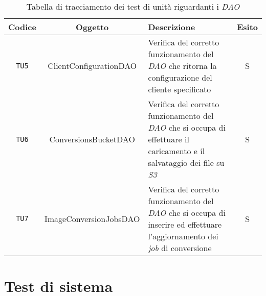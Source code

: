 \begin{table}[H]
    \caption{Tabella di tracciamento dei test di unità riguardanti i \emph{DAO}}
    \label{tab:test-dao}
    \begin{tabularx}{\textwidth}{|c|c|X|c|}
        \hline
        \textbf{Codice}                                          &
        \textbf{Oggetto}                                         & \textbf{Descrizione }  & \textbf{Esito} \\
        \hline
        \verb|TU5|                                               & ClientConfigurationDAO & Verifica del
        corretto funzionamento del \emph{DAO} che ritorna la configurazione del
        cliente specificato                                      & S                                       \\
        \hline
        \verb|TU6|                                               & ConversionsBucketDAO   & Verifica del
        corretto funzionamento del \emph{DAO} che si occupa di effettuare il
        caricamento e il salvataggio dei file su \emph{S3}       & S                                       \\
        \hline
        \verb|TU7|                                               & ImageConversionJobsDAO & Verifica del
        corretto funzionamento del \emph{DAO} che si occupa di inserire ed
        effettuare l'aggiornamento dei \emph{job} di conversione & S                                       \\
        \hline
    \end{tabularx}
\end{table}

\newpage

\section{Test di sistema}

